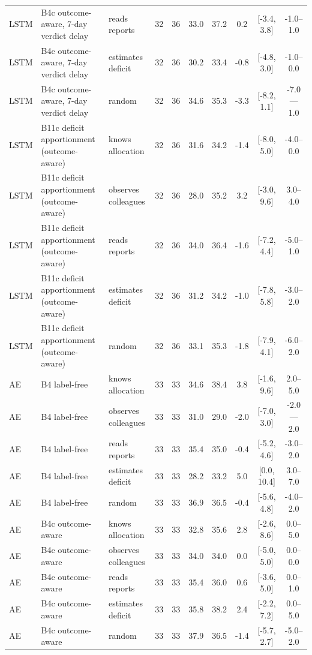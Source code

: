 \documentclass[10pt,onecolumn,letterpaper]{article}
\begin{document}
\begin{table}[!t]
\begin{tabular}{lllccccccc}
LSTM & B4c outcome-aware, 7-day verdict delay & reads reports & 32 & 36 & 33.0 & 37.2 & 0.2 & [-3.4, 3.8] & -1.0--1.0 \\
LSTM & B4c outcome-aware, 7-day verdict delay & estimates deficit & 32 & 36 & 30.2 & 33.4 & -0.8 & [-4.8, 3.0] & -1.0--0.0 \\
LSTM & B4c outcome-aware, 7-day verdict delay & random & 32 & 36 & 34.6 & 35.3 & -3.3 & [-8.2, 1.1] & -7.0---1.0 \\
LSTM & B11c deficit apportionment (outcome-aware) & knows allocation & 32 & 36 & 31.6 & 34.2 & -1.4 & [-8.0, 5.0] & -4.0--0.0 \\
LSTM & B11c deficit apportionment (outcome-aware) & observes colleagues & 32 & 36 & 28.0 & 35.2 & 3.2 & [-3.0, 9.6] & 3.0--4.0 \\
LSTM & B11c deficit apportionment (outcome-aware) & reads reports & 32 & 36 & 34.0 & 36.4 & -1.6 & [-7.2, 4.4] & -5.0--1.0 \\
LSTM & B11c deficit apportionment (outcome-aware) & estimates deficit & 32 & 36 & 31.2 & 34.2 & -1.0 & [-7.8, 5.8] & -3.0--2.0 \\
LSTM & B11c deficit apportionment (outcome-aware) & random & 32 & 36 & 33.1 & 35.3 & -1.8 & [-7.9, 4.1] & -6.0--2.0 \\
AE & B4 label-free & knows allocation & 33 & 33 & 34.6 & 38.4 & 3.8 & [-1.6, 9.6] & 2.0--5.0 \\
AE & B4 label-free & observes colleagues & 33 & 33 & 31.0 & 29.0 & -2.0 & [-7.0, 3.0] & -2.0---2.0 \\
AE & B4 label-free & reads reports & 33 & 33 & 35.4 & 35.0 & -0.4 & [-5.2, 4.6] & -3.0--2.0 \\
AE & B4 label-free & estimates deficit & 33 & 33 & 28.2 & 33.2 & 5.0 & [0.0, 10.4] & 3.0--7.0 \\
AE & B4 label-free & random & 33 & 33 & 36.9 & 36.5 & -0.4 & [-5.6, 4.8] & -4.0--2.0 \\
AE & B4c outcome-aware & knows allocation & 33 & 33 & 32.8 & 35.6 & 2.8 & [-2.6, 8.6] & 0.0--5.0 \\
AE & B4c outcome-aware & observes colleagues & 33 & 33 & 34.0 & 34.0 & 0.0 & [-5.0, 5.0] & 0.0--0.0 \\
AE & B4c outcome-aware & reads reports & 33 & 33 & 35.4 & 36.0 & 0.6 & [-3.6, 5.0] & 0.0--1.0 \\
AE & B4c outcome-aware & estimates deficit & 33 & 33 & 35.8 & 38.2 & 2.4 & [-2.2, 7.2] & 0.0--5.0 \\
AE & B4c outcome-aware & random & 33 & 33 & 37.9 & 36.5 & -1.4 & [-5.7, 2.7] & -5.0--2.0 \\

\end{tabular}
\end{table}
\end{document}
